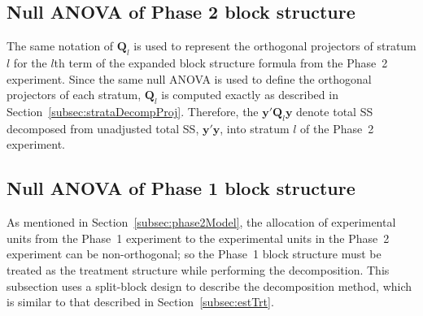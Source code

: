 \documentclass[article]{jss}
\newcommand{\Q}{\mathbf{Q}}
\begin{document}
\subsection{Null ANOVA of Phase 2 block structure}
The same notation of $\Q_l$ is used to represent the orthogonal projectors of stratum $l$ for the $l$th term of the expanded block structure formula from the Phase~2 experiment. Since the same null ANOVA is used to define the orthogonal projectors of each stratum, $\Q_l$ is computed exactly as described in Section~\ref{subsec:strataDecompProj}. Therefore, the $\bm{y}' \Q_l \bm{y}$ denote total SS decomposed from unadjusted total SS, $\bm{y}'\bm{y}$, into stratum $l$ of the Phase~2 experiment.   

\subsection{Null ANOVA of Phase 1 block structure}
As mentioned in Section~\ref{subsec:phase2Model}, the allocation of experimental units from the Phase~1 experiment to the experimental units in the Phase~2 experiment can be non-orthogonal; so the Phase~1 block structure must be treated as the treatment structure while performing the decomposition. This subsection uses a split-block design to describe the decomposition method, which is similar to that described in Section~\ref{subsec:estTrt}.
\end{document}
